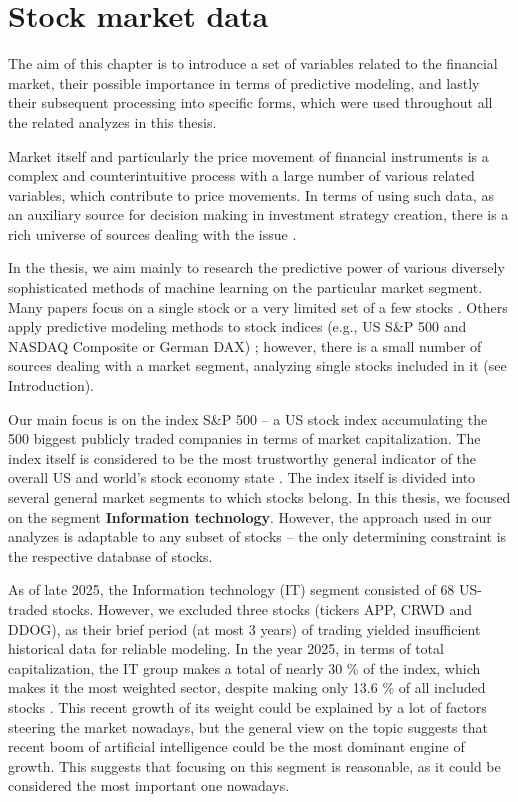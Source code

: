 \chapter{Stock market data}
\label{chap:2}
The aim of this chapter is to introduce a set of variables related to the financial market, 
their possible importance in terms of predictive modeling, and lastly their subsequent processing 
into specific forms, which were used throughout all the related analyzes in this thesis.
\par
Market itself and particularly the price movement of financial instruments is a complex and
counterintuitive process with a large number of various related variables, which contribute to price movements. 
In terms of using such data, as an auxiliary source for decision making in investment strategy creation, there is a rich
universe of sources dealing with the issue \cite{clanok1, clanok2}.
\par
%
In the thesis, we aim mainly to research the predictive power of various diversely sophisticated
methods of machine learning on the particular market segment. Many papers focus on a
single stock or a very limited set of a few stocks \cite{clanok5, vijh,konferencia1}. Others apply predictive modeling methods
to stock indices (e.g., US S\&P 500 and NASDAQ Composite or German DAX) \cite{krauss, patel}; however, there is 
a small number of sources dealing with a market segment, analyzing single stocks included in it (see Introduction).
\par
Our main focus is on the index S\&P 500 – a US stock index accumulating the 500 biggest publicly traded companies
in terms of market capitalization. The index itself is considered to be the most trustworthy general indicator of the overall
US and world’s stock economy state \cite{snp500}. The index itself is divided into several general market segments to which stocks belong. In this
thesis, we focused on the segment \textbf{Information technology}. However, the approach used in our analyzes is adaptable to any subset of stocks –
the only determining constraint is the respective database of stocks.
\par
As of late 2025, the Information technology (IT) segment consisted of $68$ US-traded stocks. However, we excluded three stocks (tickers APP, CRWD and DDOG), as their brief period (at most $3$ years) of trading yielded insufficient historical data for reliable modeling. In the year 2025, in terms of total capitalization, the IT group makes a total of
nearly 30 \% of the index, which makes it the most weighted sector, despite making only 13.6 \% of all included stocks \cite{cnbc}. This recent growth of its weight 
could be explained by a lot of factors steering the market nowadays, but the general view on the topic suggests that recent boom of artificial 
intelligence could be the most dominant engine of growth. This suggests that focusing on this segment is reasonable, as it could be considered the most important one nowadays.

